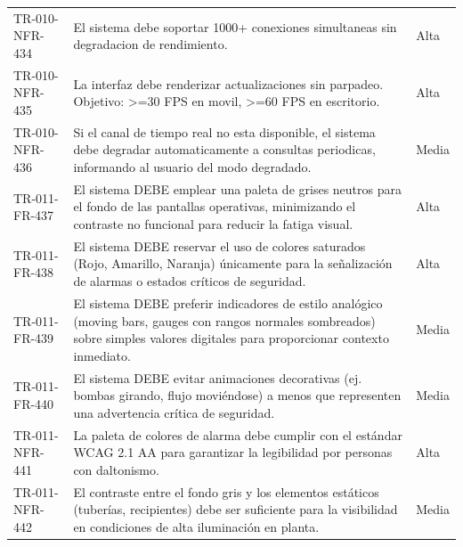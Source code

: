 \begin{longtable}{>{\raggedright\arraybackslash}p{} >{\raggedright\arraybackslash}p{} >{\raggedright\arraybackslash}p{}}
TR-010-NFR-434 & El sistema debe soportar 1000+ conexiones simultaneas sin degradacion de rendimiento. & Alta \\
TR-010-NFR-435 & La interfaz debe renderizar actualizaciones sin parpadeo. Objetivo: >=30 FPS en movil, >=60 FPS en escritorio. & Alta \\
TR-010-NFR-436 & Si el canal de tiempo real no esta disponible, el sistema debe degradar automaticamente a consultas periodicas, informando al usuario del modo degradado. & Media \\
TR-011-FR-437 & El sistema DEBE emplear una paleta de grises neutros para el fondo de las pantallas operativas, minimizando el contraste no funcional para reducir la fatiga visual. & Alta \\
TR-011-FR-438 & El sistema DEBE reservar el uso de colores saturados (Rojo, Amarillo, Naranja) únicamente para la señalización de alarmas o estados críticos de seguridad. & Alta \\
TR-011-FR-439 & El sistema DEBE preferir indicadores de estilo analógico (moving bars, gauges con rangos normales sombreados) sobre simples valores digitales para proporcionar contexto inmediato. & Media \\
TR-011-FR-440 & El sistema DEBE evitar animaciones decorativas (ej. bombas girando, flujo moviéndose) a menos que representen una advertencia crítica de seguridad. & Media \\
TR-011-NFR-441 & La paleta de colores de alarma debe cumplir con el estándar WCAG 2.1 AA para garantizar la legibilidad por personas con daltonismo. & Alta \\
TR-011-NFR-442 & El contraste entre el fondo gris y los elementos estáticos (tuberías, recipientes) debe ser suficiente para la visibilidad en condiciones de alta iluminación en planta. & Media \\
\bottomrule
\end{longtable}
\normalsize